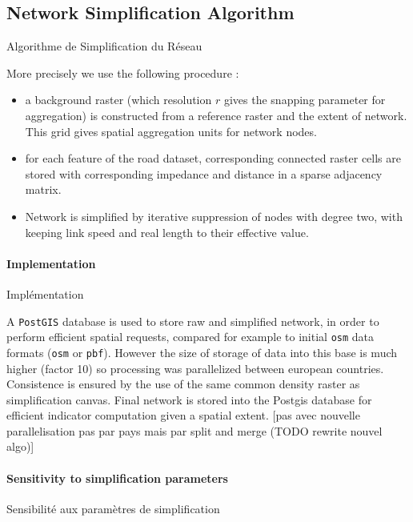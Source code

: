 \subsection{Network Simplification Algorithm}{Algorithme de Simplification du Réseau}


 
 
More precisely we use the following procedure :
\begin{itemize}
\item a background raster (which resolution $r$ gives the snapping parameter for aggregation) is constructed from a reference raster and the extent of network. This grid gives spatial aggregation units for network nodes.
\item for each feature of the road dataset, corresponding connected raster cells are stored with corresponding impedance and distance in a sparse adjacency matrix.
\item Network is simplified by iterative suppression of nodes with degree two, with keeping link speed and real length to their effective value.
\end{itemize}




\paragraph{Implementation}{Implémentation}

A \texttt{PostGIS} database is used to store raw and simplified network, in order to perform efficient spatial requests, compared for example to initial \texttt{osm} data formats (\texttt{osm} or \texttt{pbf}). However the size of storage of data into this base is much higher (factor 10) so processing was parallelized between european countries. Consistence is ensured by the use of the same common density raster as simplification canvas. Final network is stored into the Postgis database for efficient indicator computation given a spatial extent. [pas avec nouvelle parallelisation pas par pays mais par split and merge (TODO rewrite nouvel algo)]


\paragraph{Sensitivity to simplification parameters}{Sensibilité aux paramètres de simplification}

